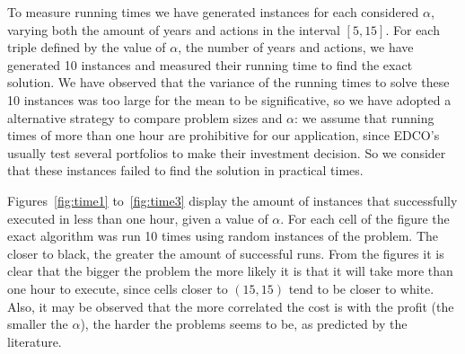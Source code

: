 To measure running times we have generated instances for each considered $\alpha$, varying both the amount of years and actions
in the interval $[5,15]$. For each triple defined by the value of $\alpha$, the number of years and actions,
we have generated 10 instances and measured their running time to find the exact solution. 
We have observed that the variance of the running times to solve these 10 instances was too large
for the mean to be significative, so we have adopted a alternative strategy to compare problem sizes
and $\alpha$:
we assume that running times of more than one hour are prohibitive for our application, since
EDCO's usually test several portfolios to make their investment decision. So we consider that
these instances failed to find the solution in practical times.

Figures~\ref{fig:time1} to~\ref{fig:time3} display the amount of instances that successfully executed in less than one hour,
given a value of $\alpha$. For each cell of the figure the exact algorithm was run 10 times using random instances of the problem.
The closer to black, the greater the amount of successful runs. 
From the figures it is clear that the bigger the problem the more likely it is that it will take more than one hour to execute, 
since cells closer to $(15,15)$ tend to be closer to white.
Also, it may be observed that the more
correlated the cost is with the profit (the smaller the $\alpha$),
the harder the problems seems to be, as predicted by the literature.


